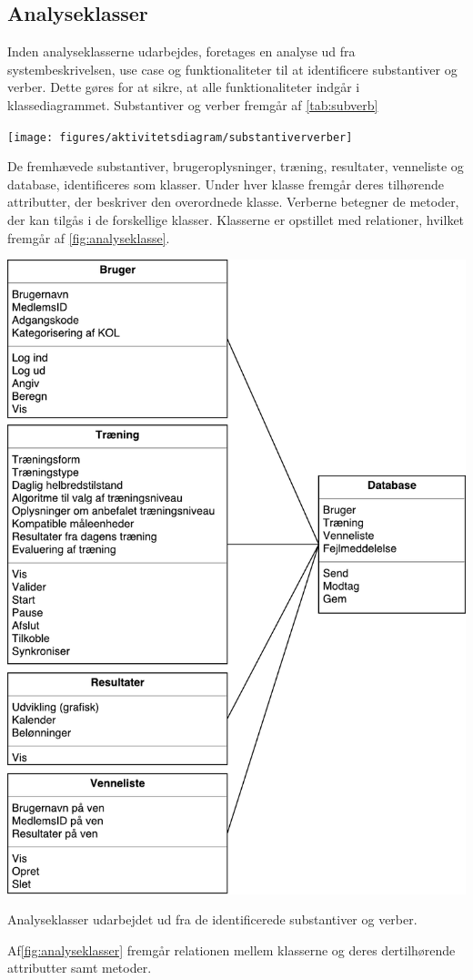 \subsection{Analyseklasser}
Inden analyseklasserne udarbejdes, foretages en analyse ud fra systembeskrivelsen, use case og funktionaliteter til at identificere substantiver og verber. Dette gøres for at sikre, at alle funktionaliteter indgår i klassediagrammet. Substantiver og verber fremgår af \autoref{tab:subverb}

\begin{tabular} [H]
\centering
\texttt{[image: figures/aktivitetsdiagram/substantiververber]}
\caption{Substantiver og verber identificeret ved analyse af systembeskrivelse, use case samt funktionaliteter.}
\label{tab:subverb}
\end{tabular}

De fremhævede substantiver, brugeroplysninger, træning, resultater, venneliste og database, identificeres som klasser. Under hver klasse fremgår deres tilhørende attributter, der beskriver den overordnede klasse. Verberne betegner de metoder, der kan tilgås i de forskellige klasser. Klasserne er opstillet med relationer, hvilket fremgår af \autoref{fig:analyseklasse}.

\begin{figur} [H]
\centering
\includegraphics[width=1\textwidth]{figures/aktivitetsdiagram/analyseklasser}
\caption{Analyseklasser udarbejdet ud fra de identificerede substantiver og verber.}
\label{fig:analyseklasse}
\end{figur}

Af\autoref{fig:analyseklasser} fremgår relationen mellem klasserne og deres dertilhørende attributter samt metoder. 

